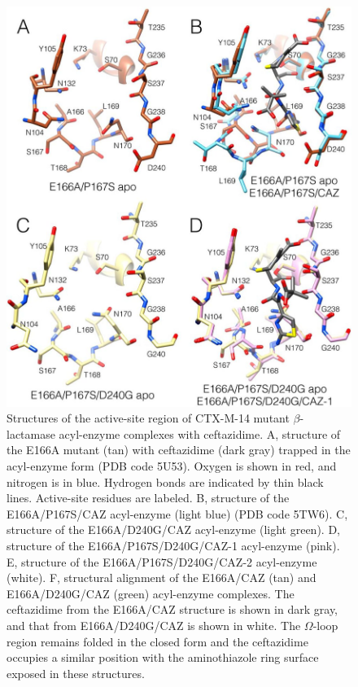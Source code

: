 \documentclass[../main.tex]{subfiles}
\begin{document}
        \begin{figure}[!htb] %
            \centering
            \includegraphics[width=5in]{ch2-fig8.jpg}
            \caption[Structures of the active-site region of CTX-M-14 mutant $\beta$-lactamase acyl-enzyme complexes with ceftazidime.]
                {Structures of the active-site region of CTX-M-14 mutant $\beta$-lactamase acyl-enzyme complexes with ceftazidime. A, structure of the E166A mutant (tan) with ceftazidime (dark gray) trapped in the acyl-enzyme form (PDB code 5U53). Oxygen is shown in red, and nitrogen is in blue. Hydrogen bonds are indicated by thin black lines. Active-site residues are labeled. B, structure of the E166A/P167S/CAZ acyl-enzyme (light blue) (PDB code 5TW6). C, structure of the E166A/D240G/CAZ acyl-enzyme (light green). D, structure of the E166A/P167S/D240G/CAZ-1 acyl-enzyme (pink). E, structure of the E166A/P167S/D240G/CAZ-2 acyl-enzyme (white). F, structural alignment of the E166A/CAZ (tan) and E166A/D240G/CAZ (green) acyl-enzyme complexes. The ceftazidime from the E166A/CAZ structure is shown in dark gray, and that from E166A/D240G/CAZ is shown in white. The $\Omega$-loop region remains folded in the closed form and the ceftazidime occupies a similar position with the aminothiazole ring surface exposed in these structures.}
            \label{fig:ch2-fig8}
        \end{figure}
\end{document}
